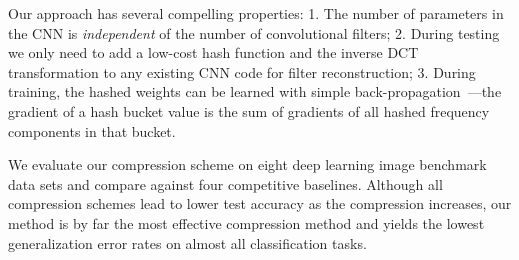 \documentclass{article} %
\begin{document}
Our approach has several compelling properties: 
1. The number of parameters in the CNN is \emph{independent} of the number of convolutional filters; 2. During testing we only need to add a low-cost hash function and the inverse DCT transformation to any existing CNN code for filter reconstruction; 3. During training, the hashed weights can be learned with simple back-propagation~\cite{bishop1995neural}---the gradient of a hash bucket value is the sum of gradients of all hashed frequency components in that bucket.

We evaluate our compression scheme on eight deep learning image benchmark data sets and compare against four competitive baselines. Although all compression schemes lead to lower test accuracy as the compression increases, our \abbrev{} method is by far the most effective compression method and yields the lowest generalization error rates on almost all classification tasks.
\end{document}
